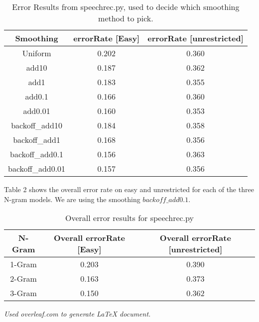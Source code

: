 \documentclass[12pt, letterpaper]{article}
\begin{document}
\begin{table}
\begin{center}
\begin{tabular}{|c|c|c|}
\hline
Smoothing & errorRate [Easy] & errorRate [unrestricted]\\
\hline \hline
Uniform & 0.202 & 0.360\\
\hline 
add10 & 0.187 & 0.362\\
\hline 
add1 & 0.183 & 0.355\\
\hline 
add0.1 & 0.166 & 0.360\\
\hline 
add0.01 & 0.160 & 0.353\\
\hline 
backoff\_add10 & 0.184 & 0.358\\
\hline 
backoff\_add1 & 0.168 & 0.356\\
\hline 
backoff\_add0.1 & 0.156 & 0.363\\
\hline 
backoff\_add0.01 & 0.157 & 0.356\\
\hline
\end{tabular}
\end{center}
\caption{Error Results from speechrec.py, used to decide which smoothing method to pick.}
\label{tableOne}
\end{table}

Table 2 shows the overall error rate on easy and unrestricted for each of the three N-gram models. We are using the smoothing $backoff\_add0.1$. 

\begin{table}
\begin{center}
\begin{tabular}{|c|c|c|}
\hline
N-Gram & Overall errorRate [Easy] & Overall errorRate [unrestricted]\\
\hline \hline
1-Gram & 0.203 & 0.390\\
\hline
2-Gram & 0.163 & 0.373\\
\hline
3-Gram & 0.150 & 0.362\\
\hline
\end{tabular}
\end{center}
\caption{Overall error results for speechrec.py}
\label{tableTwo}
\end{table}

\begin{center}
\textit{Used overleaf.com to generate LaTeX document.}
\end{center}
\end{document}
